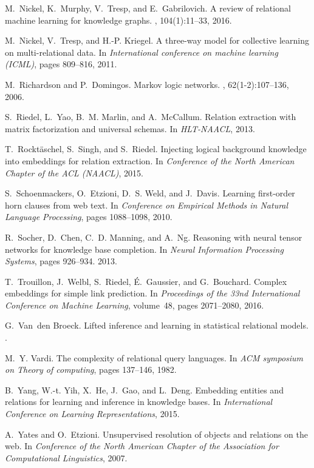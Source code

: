 \documentclass{article}
\begin{document}
\begin{thebibliography}{10}
M.~Nickel, K.~Murphy, V.~Tresp, and E.~Gabrilovich.
\newblock A review of relational machine learning for knowledge graphs.
, 104(1):11--33, 2016.

M.~Nickel, V.~Tresp, and H.-P. Kriegel.
\newblock A three-way model for collective learning on multi-relational data.
\newblock In {\em International conference on machine learning (ICML)}, pages
  809--816, 2011.

M.~Richardson and P.~Domingos.
\newblock Markov logic networks.
, 62(1-2):107--136, 2006.

S.~Riedel, L.~Yao, B.~M. Marlin, and A.~McCallum.
\newblock Relation extraction with matrix factorization and universal schemas.
\newblock In {\em HLT-NAACL}, 2013.

T.~Rockt{\"{a}}schel, S.~Singh, and S.~Riedel.
\newblock Injecting logical background knowledge into embeddings for relation
  extraction.
\newblock In {\em Conference of the North American Chapter of the ACL (NAACL)},
  2015.

S.~Schoenmackers, O.~Etzioni, D.~S. Weld, and J.~Davis.
\newblock Learning first-order horn clauses from web text.
\newblock In {\em Conference on Empirical Methods in Natural Language
  Processing}, pages 1088--1098, 2010.

R.~Socher, D.~Chen, C.~D. Manning, and A.~Ng.
\newblock Reasoning with neural tensor networks for knowledge base completion.
\newblock In {\em Neural Information Processing Systems}, pages 926--934. 2013.

T.~Trouillon, J.~Welbl, S.~Riedel, {\'{E}}.~Gaussier, and G.~Bouchard.
\newblock Complex embeddings for simple link prediction.
\newblock In {\em Proceedings of the 33nd International Conference on Machine
  Learning}, volume~48, pages 2071--2080, 2016.

G.~Van~den Broeck.
\newblock Lifted inference and learning in statistical relational models.
.

M.~Y. Vardi.
\newblock The complexity of relational query languages.
\newblock In {\em ACM symposium on Theory of computing}, pages 137--146, 1982.

B.~Yang, W.-t. Yih, X.~He, J.~Gao, and L.~Deng.
\newblock Embedding entities and relations for learning and inference in
  knowledge bases.
\newblock In {\em International Conference on Learning Representations}, 2015.

A.~Yates and O.~Etzioni.
\newblock Unsupervised resolution of objects and relations on the web.
\newblock In {\em Conference of the North American Chapter of the Association
  for Computational Linguistics}, 2007.

\end{thebibliography}
\end{document}
